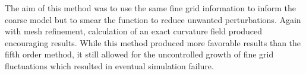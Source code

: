  The aim of this method was to use the same fine grid information to inform the coarse model but to smear the function to reduce unwanted perturbations. Again with mesh refinement, calculation of an exact curvature field produced encouraging results. While this method produced more favorable results than the fifth order method, it still allowed for the uncontrolled growth of fine grid fluctuations which resulted in eventual simulation failure. 

